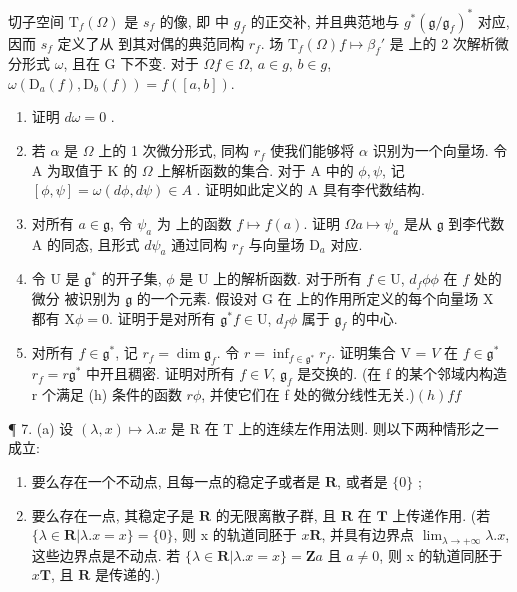 切子空间 \(\mathrm{T}_{f}(\Omega)\) 是 \(s_{f}\) 的像, 即  中 \(g_{f}\) 的正交补, 并且典范地与 \(g^{*}\)\((\mathfrak{g}/\mathfrak{g}_{f})^{*}\) 对应, 因而 \(s_{f}\) 定义了从  到其对偶的典范同构 \(r_{f}\). 场 \(\mathrm{T}_{f}(\Omega)\)\(f \mapsto \beta_{f}'\) 是  上的 2 次解析微分形式 \(\omega\), 且在 G 下不变. 对于 \(\Omega\)\(f \in \Omega\), \(a \in g\), \(b \in g\), \(\omega(\mathrm{D}_{a}(f), \mathrm{D}_{b}(f)) = f([a, b])\).

\begin{enumerate}
\def\labelenumi{(\alph{enumi})}
\setcounter{enumi}{4}
\item
  证明 \(d\omega = 0\) .
\item
  若 \(\alpha\) 是 \(\Omega\) 上的 1 次微分形式, 同构 \(r_f\) 使我们能够将 \(\alpha\) 识别为一个向量场. 令 A 为取值于 K 的 \(\Omega\) 上解析函数的集合. 对于 A 中的 \(\phi, \psi\), 记 \([\phi, \psi] = \omega(d\phi, d\psi) \in A\) . 证明如此定义的 A 具有李代数结构.
\item
  对所有 \(a \in \mathfrak{g}\), 令 \(\psi_{a}\) 为  上的函数 \(f \mapsto f(a)\). 证明 \(\Omega\)\(a \mapsto \psi_{a}\) 是从 \(\mathfrak{g}\) 到李代数 A 的同态, 且形式 \(d\psi_{a}\) 通过同构 \(r_{f}\) 与向量场 \(\mathrm{D}_{a}\) 对应.
\item
  令 U 是 \(\mathfrak{g}^*\) 的开子集, \(\phi\) 是 U 上的解析函数. 对于所有 \(f\in \mathrm{U}\), \(d_{f}\phi\)\(\phi\) 在 \(f\) 处的微分  被识别为 \(\mathfrak{g}\) 的一个元素. 假设对 G 在  上的作用所定义的每个向量场 X 都有 \(\mathrm{X}\phi = 0\). 证明于是对所有 \(\mathfrak{g}^*\)\(f\in \mathrm{U}\), \(d_{f}\phi\) 属于 \(\mathfrak{g}_f\) 的中心.
\item
  对所有 \(f \in \mathfrak{g}^*\), 记 \(r_f = \dim \mathfrak{g}_f\). 令 \(r = \inf_{f \in \mathfrak{g}^*} r_f\). 证明集合 V = \(V\) 在 \(f \in \mathfrak{g}^*\)\(r_f = r\)\(\mathfrak{g}^*\) 中开且稠密. 证明对所有 \(f \in V\), \(\mathfrak{g}_f\) 是交换的. (在 f 的某个邻域内构造 r 个满足 (h) 条件的函数 \(r\)\(\phi\), 并使它们在 f 处的微分线性无关.)\((h)\)\(f\)\(f\)
\end{enumerate}

¶ 7. (a) 设 \((\lambda, x) \mapsto \lambda.x\) 是 R 在 T 上的连续左作用法则. 则以下两种情形之一成立:

\begin{enumerate}
\def\labelenumi{(\arabic{enumi})}
\item
  要么存在一个不动点, 且每一点的稳定子或者是 \(\mathbf{R}\), 或者是 \(\{0\}\) ;
\item
  要么存在一点, 其稳定子是 \(\mathbf{R}\) 的无限离散子群, 且 \(\mathbf{R}\) 在 \(\mathbf{T}\) 上传递作用. (若 \(\{\lambda \in \mathbf{R}|\lambda .x = x\} = \{0\}\), 则 x 的轨道同胚于 \(x\)\(\mathbf{R}\), 并具有边界点 \(\lim_{\lambda \to +\infty}\lambda .x\), 这些边界点是不动点. 若 \(\{\lambda \in \mathbf{R}|\lambda .x = x\} = \mathbf{Z}a\) 且 \(a\neq 0\), 则 x 的轨道同胚于 \(x\)\(\mathbf{T}\), 且 \(\mathbf{R}\) 是传递的.)
\end{enumerate}

